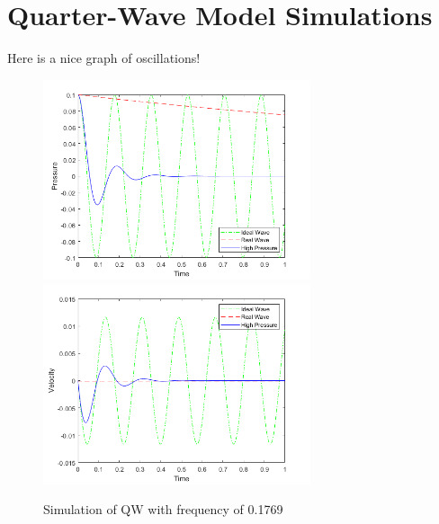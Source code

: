 \section{Quarter-Wave Model Simulations}

Here is a nice graph of oscillations!

\begin{figure}[ht]
    \centering
    \includegraphics[width=0.7\textwidth]{Figures/QWMSimulation/QWMBehaviourB.png}
    \includegraphics[width=0.7\textwidth]{Figures/QWMSimulation/QWMBehaviourC.png}
    \caption{Simulation of QW with frequency of 0.1769}
    \label{fig: QWMBehaviour}
\end{figure}

\newpage


\newpage
